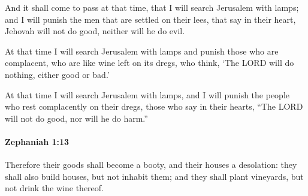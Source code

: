 			\begin{versebox}
					\item[BHS] 
					\item[LXX] 
					\item[ASV] And it shall come to pass at that time, that I will search Jerusalem with lamps; and I will punish the men that are settled on their lees, that say in their heart, Jehovah will not do good, neither will he do evil.
					\item[NIV] At that time I will search Jerusalem with lamps and punish those who are complacent, who are like wine left on its dregs, who think, ‘The LORD will do nothing, either good or bad.’
					\item[NRSV] At that time I will search Jerusalem with lamps, and I will punish the people who rest complacently on their dregs, those who say in their hearts, “The LORD will not do good, nor will he do harm.”
			\end{versebox}

		\paragraph{Zephaniah 1:13} %
			\label{ZEPHANIAH-1-13}

			Therefore their goods shall become a booty, and their houses a desolation: they shall also build houses, but not inhabit them; and they shall plant vineyards, but not drink the wine thereof.

